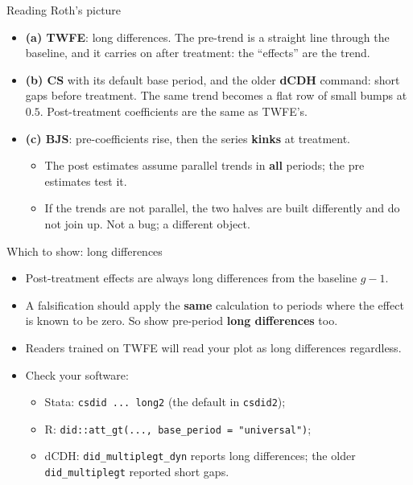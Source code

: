 \documentclass[
  11pt,
  ignorenonframetext,
  aspectratio=169,
]{beamer}
\providecommand{\tightlist}{%
  \setlength{\itemsep}{0pt}\setlength{\parskip}{0pt}}
\begin{document}
\begin{frame}{Reading Roth's picture}
\protect{}\label{reading-roths-picture}
\begin{itemize}
\tightlist
\item
  \textbf{(a) TWFE}: long differences. The pre-trend is a straight line
  through the baseline, and it carries on after treatment: the
  ``effects'' are the trend.
\item
  \textbf{(b) CS} with its default base period, and the older
  \textbf{dCDH} command: short gaps before treatment. The same trend
  becomes a flat row of small bumps at \(0.5\). Post-treatment
  coefficients are the same as TWFE's.
\item
  \textbf{(c) BJS}: pre-coefficients rise, then the series
  \textbf{kinks} at treatment.

  \begin{itemize}
  \tightlist
  \item
    The post estimates assume parallel trends in \textbf{all} periods;
    the pre estimates test it.
  \item
    If the trends are not parallel, the two halves are built differently
    and do not join up. Not a bug; a different object.
  \end{itemize}
\end{itemize}
\end{frame}

\begin{frame}[fragile]{Which to show: long differences}
\protect{}\label{which-to-show-long-differences}
\begin{itemize}
\tightlist
\item
  Post-treatment effects are always long differences from the baseline
  \(g - 1\).
\item
  A falsification should apply the \textbf{same} calculation to periods
  where the effect is known to be zero. So show pre-period \textbf{long
  differences} too.
\item
  Readers trained on TWFE will read your plot as long differences
  regardless.
\end{itemize}

\vspace{0.4em}

\begin{itemize}
\tightlist
\item
  Check your software:

  \begin{itemize}
  \tightlist
  \item
    Stata: \texttt{csdid\ ...\ long2} (the default in \texttt{csdid2});
  \item
    R: \texttt{did::att\_gt(...,\ base\_period\ =\ "universal")};
  \item
    dCDH: \texttt{did\_multiplegt\_dyn} reports long differences; the
    older \texttt{did\_multiplegt} reported short gaps.
  \end{itemize}
\end{itemize}
\end{frame}
\end{document}
